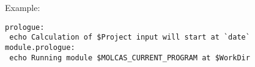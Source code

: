 Example:
\begin{verbatim}
prologue:
 echo Calculation of $Project input will start at `date`
module.prologue:
 echo Running module $MOLCAS_CURRENT_PROGRAM at $WorkDir
\end{verbatim}






